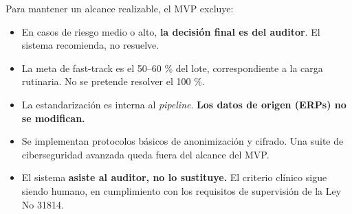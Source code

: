 Para mantener un alcance realizable, el MVP excluye:

\begin{itemize}
    \item En casos de riesgo medio o alto, \textbf{la decisión final es del auditor}. El sistema recomienda, no resuelve.
    \item La meta de fast-track es el 50–60 \% del lote, correspondiente a la carga rutinaria. No se pretende resolver el 100 \%.
    \item La estandarización es interna al \textit{pipeline}. \textbf{Los datos de origen (ERPs) no se modifican.}
    \item Se implementan protocolos básicos de anonimización y cifrado. Una suite de ciberseguridad avanzada queda fuera del alcance del MVP.
    \item El sistema \textbf{asiste al auditor, no lo sustituye.} El criterio clínico sigue siendo humano, en cumplimiento con los requisitos de supervisión de la Ley No 31814.

\end{itemize}


